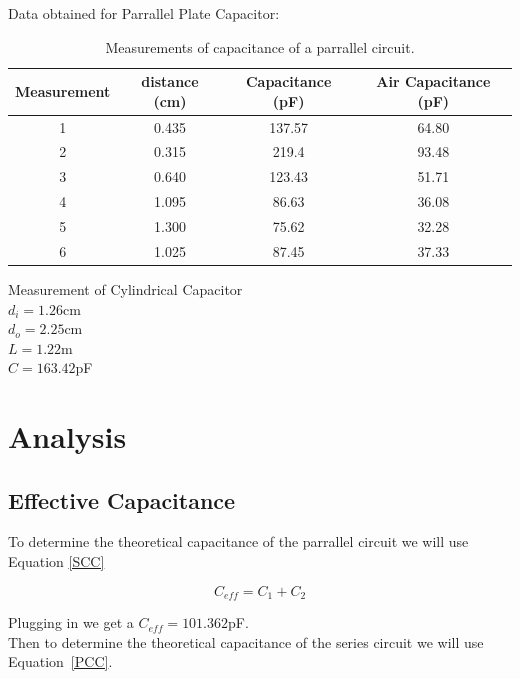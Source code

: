 \documentclass[10pt]{article}
\begin{document}
Data obtained for Parrallel Plate Capacitor:
\begin{table}[!h]\label{Table 2}
  \begin{center}
    \begin{tabular}{|c|c|c|c|}
      \hline
      Measurement & distance (cm) & Capacitance (pF) & Air Capacitance (pF) \\
      \hline
      1    &  0.435 & 137.57 &     64.80              \\
      \hline
      2    &  0.315     & 219.4&   93.48 \\
      \hline
      3     &      0.640    & 123.43 &  51.71         \\
      \hline
      4     &    1.095    & 86.63 &     36.08     \\
      \hline
      5     &     1.300   & 75.62 &       32.28   \\
      \hline
      6     &    1.025    & 87.45 &       37.33   \\
      \hline
    \end{tabular}
    \caption[short]{Measurements of capacitance of a parrallel circuit.}
  \end{center}
\end{table}

Measurement of Cylindrical Capacitor\\
$d_{i} = 1.26$cm\\
$d_{o} = 2.25$cm\\
$L = 1.22$m\\
$C = 163.42$pF\\

\section{Analysis}
\subsection*{Effective Capacitance}

To determine the theoretical capacitance of the parrallel 
circuit we will use Equation \ref{SCC}

\begin{equation}\label{SCC}
  C_{eff} = C_{1} + C_{2}
\end{equation}

Plugging in we get a $C_{eff} = 101.362$pF.\\
Then to determine the theoretical capacitance of the series 
circuit we will use Equation~\ref{PCC}.\\
\end{document}
